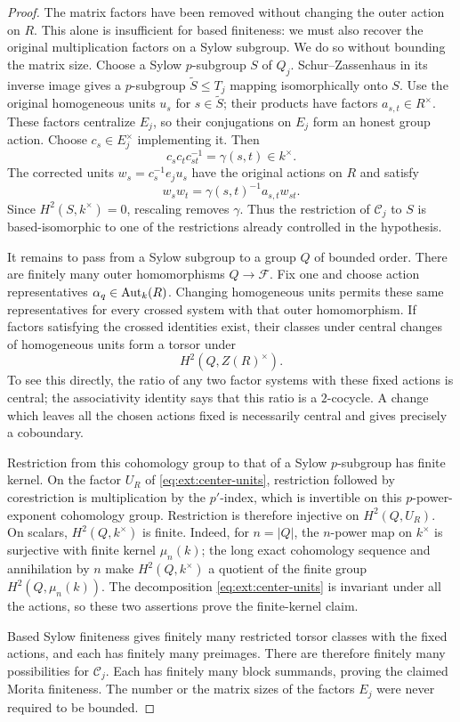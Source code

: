\begin{proof}
The matrix factors have been removed without changing the outer
action on $R$.  This alone is insufficient for based finiteness:
we must also recover the original multiplication factors on a
Sylow subgroup.  We do so without bounding the matrix size.
Choose a Sylow $p$-subgroup $S$ of $Q_j$.  Schur--Zassenhaus in
its inverse image gives a $p$-subgroup $\widetilde S\leq T_j$
mapping isomorphically onto $S$.  Use the original homogeneous
units $u_s$ for $s\in\widetilde S$; their products have factors
$a_{s,t}\in R^\times$.  These factors centralize $E_j$, so their
conjugations on $E_j$ form an honest group action.  Choose
$c_s\in E_j^\times$ implementing it.  Then
\[
 c_sc_tc_{st}^{-1}=\gamma(s,t)\in k^\times.
\]
The corrected units $w_s=c_s^{-1}e_ju_s$ have the original actions
on $R$ and satisfy
\[
 w_sw_t=\gamma(s,t)^{-1}a_{s,t}w_{st}.
\]
Since $H^2(S,k^\times)=0$, rescaling removes $\gamma$.  Thus the
restriction of $\mathcal C_j$ to $S$ is based-isomorphic to one
of the restrictions already controlled in the hypothesis.

It remains to pass from a Sylow subgroup to a group $Q$ of bounded
order.  There are finitely many outer homomorphisms
$Q\to\mathcal F$.  Fix one and choose action representatives
$\alpha_q\in\operatorname{Aut}_k(R)$.  Changing homogeneous units permits
these same representatives for every crossed system with that
outer homomorphism.  If factors satisfying the crossed identities
exist, their classes under central changes of homogeneous units
form a torsor under
\[
 H^2(Q,Z(R)^\times).
\]
To see this directly, the ratio of any two factor systems with
these fixed actions is central; the associativity identity says
that this ratio is a $2$-cocycle.  A change which leaves all the
chosen actions fixed is necessarily central and gives precisely
a coboundary.

Restriction from this cohomology group to that of a Sylow
$p$-subgroup has finite kernel.  On the factor $U_R$ of
\eqref{eq:ext:center-units}, restriction followed by corestriction
is multiplication by the $p'$-index, which is invertible on this
$p$-power-exponent cohomology group.  Restriction is therefore
injective on $H^2(Q,U_R)$.  On scalars, $H^2(Q,k^\times)$ is
finite.  Indeed, for $n=|Q|$, the $n$-power map on $k^\times$ is
surjective with finite kernel $\mu_n(k)$; the long exact
cohomology sequence and annihilation by $n$ make
$H^2(Q,k^\times)$ a quotient of the finite group
$H^2(Q,\mu_n(k))$.  The decomposition
\eqref{eq:ext:center-units} is invariant under all the actions,
so these two assertions prove the finite-kernel claim.

Based Sylow finiteness gives finitely many restricted torsor
classes with the fixed actions, and each has finitely many
preimages.  There are therefore finitely many possibilities for
$\mathcal C_j$.  Each has finitely many block summands, proving
the claimed Morita finiteness.  The number or the matrix sizes
of the factors $E_j$ were never required to be bounded.
\end{proof}

